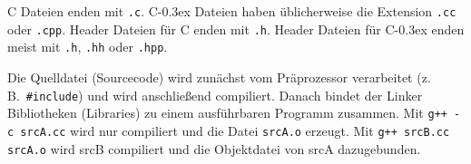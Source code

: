 \documentclass[10pt,twocolumn]{scrartcl}
\newcommand*\cpp{C\kern-0.3ex\raisebox{0.17ex}{\texttt{+\kern-0.3ex+}}}
\begin{document}
C Dateien enden mit \lstinline|.c|. \cpp{} Dateien haben üblicherweise die
Extension \lstinline|.cc| oder \lstinline|.cpp|. Header Dateien für C enden mit
\lstinline|.h|. Header Dateien für \cpp{} enden meist mit \lstinline|.h|,
\lstinline|.hh| oder \lstinline|.hpp|.

Die Quelldatei (Sourcecode) wird zunächst vom Präprozessor verarbeitet (z.\,B.\
\lstinline|#include|) und wird anschließend compiliert. Danach bindet der Linker
Bibliotheken (Libraries) zu einem ausführbaren Programm zusammen. Mit
\lstinline|g++ -c srcA.cc| wird nur compiliert und die Datei \lstinline|srcA.o|
erzeugt. Mit \lstinline|g++ srcB.cc srcA.o| wird srcB compiliert und die
Objektdatei von srcA dazugebunden.




















\end{document}
